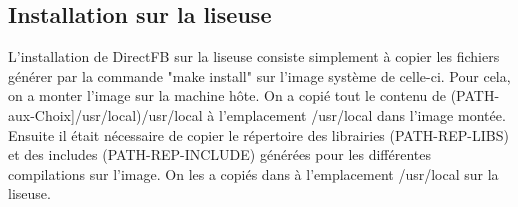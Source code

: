 \subsection{Installation sur la liseuse}

L'installation de DirectFB sur la liseuse consiste simplement à copier les fichiers générer par la commande "make install" sur l'image système de celle-ci. Pour cela, on a monter l'image sur la machine hôte. On a copié tout le contenu de (PATH-aux-Choix]/usr/local)/usr/local à l'emplacement /usr/local dans l'image montée. Ensuite il était nécessaire de copier le répertoire des librairies (PATH-REP-LIBS) et des includes (PATH-REP-INCLUDE) générées pour les différentes compilations sur l'image. On les a copiés dans à l'emplacement /usr/local sur la liseuse. 

